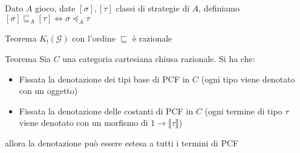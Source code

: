 \documentclass{beamer}
\begin{document}
\begin{frame}
	
	Dato $A$ gioco, date $[\sigma],[\tau]$ classi di strategie di $A$, definiamo
	$[\sigma] \sqsubseteq_A [\tau] \Leftrightarrow \sigma \preccurlyeq_A \tau$ \\
	\begin{block}{Teorema}
		$K_! (\mathcal{G})$ con l'ordine $\sqsubseteq$ è razionale
	\end{block}
	
	\begin{block}{Teorema}
		Sia $C$ una categoria cartesiana chiusa razionale. Si ha che:
		\begin{itemize}
			\item Fissata la denotazione dei tipi base di PCF in $C$ (ogni tipo viene denotato con un oggetto)
			\item Fissata la denotazione delle costanti di PCF in $C$ (ogni termine di tipo $\tau$ viene denotato con un morfismo di $1\rightarrow \llbracket \tau \rrbracket$)
		\end{itemize}
		allora la denotazione può essere estesa a tutti i termini di PCF
		
	\end{block}
	
\end{frame}
\end{document}
